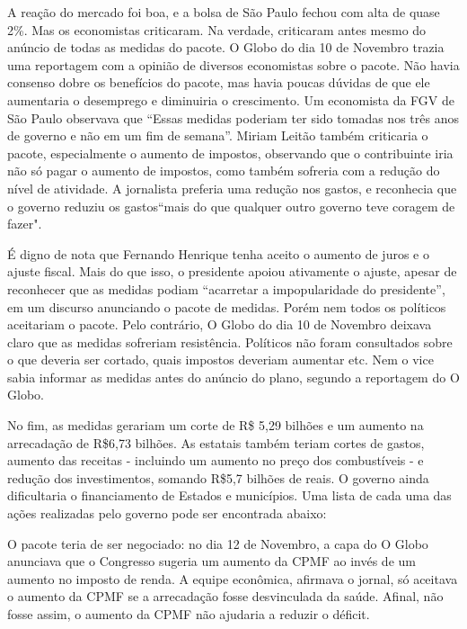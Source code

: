 \documentclass{article}
\begin{document}
A reação do mercado foi boa, e a bolsa de São Paulo fechou com alta de quase 2\%. Mas os economistas criticaram. Na verdade, criticaram antes mesmo do anúncio de todas as medidas do pacote. O Globo do dia 10 de Novembro trazia uma reportagem com a opinião de diversos economistas sobre o pacote. Não havia consenso dobre os benefícios do pacote, mas havia poucas dúvidas de que ele aumentaria o desemprego e diminuiria o crescimento. Um economista da FGV de São Paulo observava que ``Essas medidas poderiam ter sido tomadas nos três anos de governo e não em um fim de semana''. Miriam Leitão também criticaria o pacote, especialmente o aumento de impostos, observando que o contribuinte iria não só pagar o aumento de impostos, como também sofreria com a redução do nível de atividade. A jornalista preferia uma redução nos gastos, e reconhecia que o governo reduziu os gastos``mais do que qualquer outro governo teve coragem de fazer". 

É digno de nota que Fernando Henrique tenha aceito o aumento de juros e o ajuste fiscal. Mais do que isso, o presidente apoiou ativamente o ajuste, apesar de reconhecer que as medidas podiam ``acarretar a impopularidade do presidente'', em um discurso anunciando o pacote de medidas. Porém nem todos os políticos aceitariam o pacote. Pelo contrário, O Globo do dia 10 de Novembro deixava claro que as medidas sofreriam resistência. Políticos não foram consultados sobre o que deveria ser cortado, quais impostos deveriam aumentar etc. Nem o vice sabia informar as medidas antes do anúncio do plano, segundo a reportagem do O Globo. 

No fim, as medidas gerariam um corte de R\$ 5,29 bilhões e um aumento na arrecadação de R\$6,73 bilhões. As estatais também teriam cortes de gastos, aumento das receitas - incluindo um aumento no preço dos combustíveis - e redução dos investimentos, somando R\$5,7 bilhões de reais. O governo ainda dificultaria o financiamento de Estados e municípios. Uma lista de cada uma das ações realizadas pelo governo pode ser encontrada abaixo:

 

O pacote teria de ser negociado: no dia 12 de Novembro, a capa do O Globo anunciava que o Congresso sugeria um aumento da CPMF ao invés de um aumento no imposto de renda. A equipe econômica, afirmava o jornal, só aceitava o aumento da CPMF se a arrecadação fosse desvinculada da saúde. Afinal, não fosse assim, o aumento da CPMF não ajudaria a reduzir o déficit. 
\end{document}
